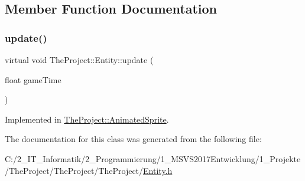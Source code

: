 \subsection{Member Function Documentation}
\mbox{\label{class_the_project_1_1_entity_a8ec5c42d4c918f5c98a482fb28b72da2}} 
\subsubsection{\texorpdfstring{update()}{update()}}
{\footnotesize\ttfamily virtual void The\+Project\+::\+Entity\+::update (\begin{DoxyParamCaption}\item[{float}]{game\+Time }\end{DoxyParamCaption})\hspace{0.3cm}{\ttfamily [pure virtual]}}



Implemented in \mbox{\hyperlink{class_the_project_1_1_animated_sprite_a25b0a4ce67cceb27c8e777443d1a8249}{The\+Project\+::\+Animated\+Sprite}}.



The documentation for this class was generated from the following file\+:\begin{DoxyCompactItemize}
\item 
C\+:/2\+\_\+\+I\+T\+\_\+\+Informatik/2\+\_\+\+Programmierung/1\+\_\+\+M\+S\+V\+S2017\+Entwicklung/1\+\_\+\+Projekte/\+The\+Project/\+The\+Project/\+The\+Project/\mbox{\hyperlink{_entity_8h}{Entity.\+h}}\end{DoxyCompactItemize}
